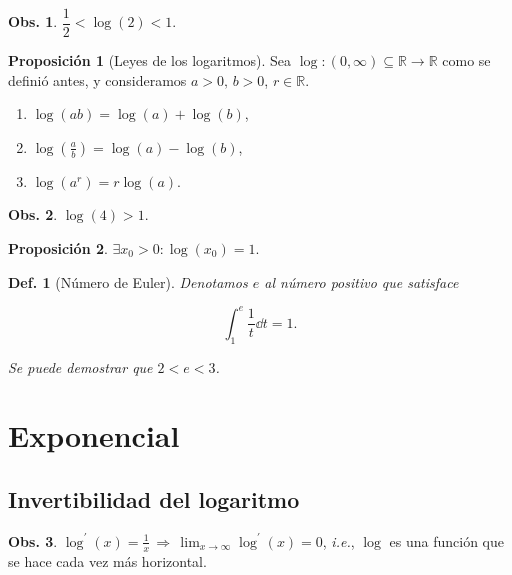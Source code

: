 \documentclass{article}
\theoremstyle{definicion}
\newtheorem{definicion}{Def.}
\theoremstyle{definition}             %
\theoremstyle{definition}             %
\theoremstyle{definition}
\theoremstyle{definition}
\theoremstyle{observacion}
\newtheorem{obs}{Obs.}
\theoremstyle{definition}
\newtheorem{prop}{Proposición}
\theoremstyle{plain}
\theoremstyle{definition}
\theoremstyle{afirmacion}
\theoremstyle{definition}
\begin{document}
    \begin{obs}
        \(\dfrac{1}{2} < \log(2) < 1.\)
    \end{obs}

    \begin{prop}[Leyes de los logaritmos]
        Sea \(\log \colon (0, \infty) \subseteq \mathbb{R} \to \mathbb{R}\) como se definió antes, y consideramos \(a > 0,\, b > 0\), \(r\in\mathbb{R}\).
        
        \begin{enumerate}[label = \roman*)]
            \item \(\log(ab) = \log(a) + \log(b)\),
            \item \(\log(\frac{a}{b}) = \log(a) - \log(b)\),
            \item \(\log(a^{r}) = r\log(a)\).
        \end{enumerate}
    \end{prop}

    \begin{obs}
        \(\log(4) > 1.\)
    \end{obs}

    \begin{prop}
        \(\exists x_{0} > 0 \colon \log(x_{0}) = 1.\)
    \end{prop}

    \begin{definicion}[Número de Euler] 
        Denotamos \(e\) al número positivo que satisface 

        \begin{equation*}
            \int_{1}^{e} \dfrac{1}{t}\dd{t} = 1.
        \end{equation*}

        Se puede demostrar que \(2 < e < 3\).
    \end{definicion}

    \section{Exponencial}
    \subsection{Invertibilidad del logaritmo}

    \begin{obs}
        \(\log^{\prime}(x) = \frac{1}{x}\, \Rightarrow\, \lim_{x\to\infty}\log^{\prime}(x) = 0\), \emph{i.e.}, \(\log\) es una función que se hace cada vez más horizontal.
    \end{obs}
\end{document}
